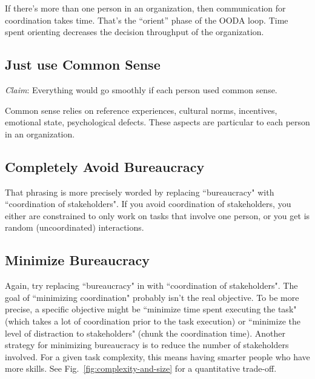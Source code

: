 If there's more than one person in an organization, then communication for coordination takes time. That's the ``orient'' phase of the OODA loop. Time spent orienting decreases the decision throughput of the organization.



\subsection{Just use Common Sense}
\textit{Claim}: Everything would go smoothly if each person used common sense.

Common sense relies on reference experiences, cultural norms, incentives, emotional state, psychological defects. These aspects are particular to each person in an organization. 


\subsection{Completely Avoid Bureaucracy}
That phrasing is more precisely worded by replacing ``bureaucracy" with ``coordination of stakeholders". If you avoid coordination of stakeholders, you either are constrained to only work on tasks that involve one person, or you get is random (uncoordinated) interactions. 

\subsection{Minimize Bureaucracy}
Again, try replacing ``bureaucracy" in with ``coordination of stakeholders". The goal of ``minimizing coordination" probably isn't the real objective. To be more precise, a specific objective might be ``minimize time spent executing the task" (which takes a lot of coordination prior to the task execution) or ``minimize the level of distraction to stakeholders" (chunk the coordination time). Another strategy for minimizing bureaucracy is to reduce the number of stakeholders involved. For a given task complexity, this means having smarter people who have more skills. See Fig.~\ref{fig:complexity-and-size} for a quantitative trade-off. 



